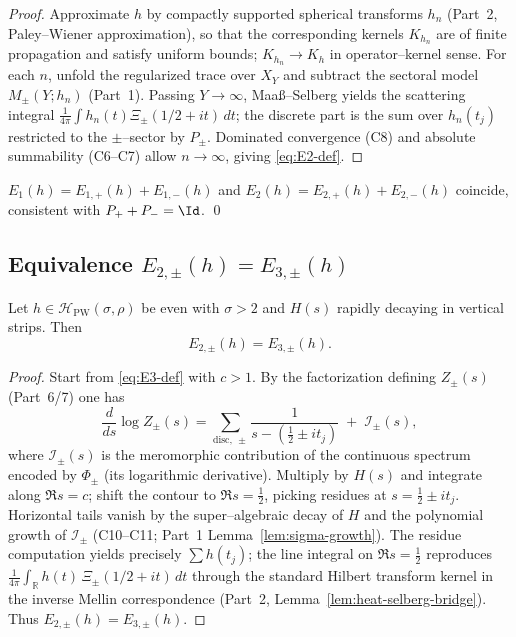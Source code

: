 \begin{proof}
Approximate $h$ by compactly supported spherical transforms $h_n$ (Part~2, Paley–Wiener approximation), so that the corresponding kernels $K_{h_n}$ are of finite propagation and satisfy uniform bounds; $K_{h_n}\to K_h$ in operator–kernel sense. For each $n$, unfold the regularized trace over $X_Y$ and subtract the sectoral model $M_\pm(Y;h_n)$ (Part~1). Passing $Y\to\infty$, Maaß–Selberg yields the scattering integral $\frac{1}{4\pi}\int h_n(t)\Xi_\pm(1/2+it)\,dt$; the discrete part is the sum over $h_n(t_j)$ restricted to the $\pm$–sector by $P_\pm$. Dominated convergence (C8) and absolute summability (C6–C7) allow $n\to\infty$, giving \eqref{eq:E2-def}.  %
\end{proof}

\begin{corollary}
\label{cor:additivity}
$E_1(h)=E_{1,+}(h)+E_{1,-}(h)$ and $E_2(h)=E_{2,+}(h)+E_{2,-}(h)$ coincide, consistent with $P_++P_-=\Id$. \qed %
\end{corollary}


\subsection{Equivalence $E_{2,\pm}(h)=E_{3,\pm}(h)$}
\label{subsec:ch6-part3-E2E3} \relax \hspace{0pt}
\begin{theorem}
\label{thm:E2=E3}
Let $h\in\mathcal H_{\mathrm{PW}}(\sigma,\rho)$ be even with $\sigma>2$ and $H(s)$ rapidly decaying in vertical strips. Then
\[
E_{2,\pm}(h)=E_{3,\pm}(h).
\]
\end{theorem}

\begin{proof}
Start from \eqref{eq:E3-def} with $c>1$. By the factorization defining $Z_\pm(s)$ (Part~6/7) one has
\[
\frac{d}{ds}\log Z_\pm(s)
=\sum_{\mathrm{disc,\ \pm}}\frac{1}{s-(\tfrac12\pm it_j)}
\;+\;\mathcal I_\pm(s),
\]
where $\mathcal I_\pm(s)$ is the meromorphic contribution of the continuous spectrum encoded by $\Phi_\pm$ (its logarithmic derivative). Multiply by $H(s)$ and integrate along $\Re s=c$; shift the contour to $\Re s=\tfrac12$, picking residues at $s=\tfrac12\pm it_j$. Horizontal tails vanish by the super–algebraic decay of $H$ and the polynomial growth of $\mathcal I_\pm$ (C10–C11; Part~1 Lemma~\ref{lem:sigma-growth}). The residue computation yields precisely $\sum h(t_j)$; the line integral on $\Re s=\tfrac12$ reproduces $\frac{1}{4\pi}\int_{\mathbb R} h(t)\,\Xi_\pm(1/2+it)\,dt$ through the standard Hilbert transform kernel in the inverse Mellin correspondence (Part~2, Lemma~\ref{lem:heat-selberg-bridge}). Thus $E_{2,\pm}(h)=E_{3,\pm}(h)$.  %
\end{proof}

